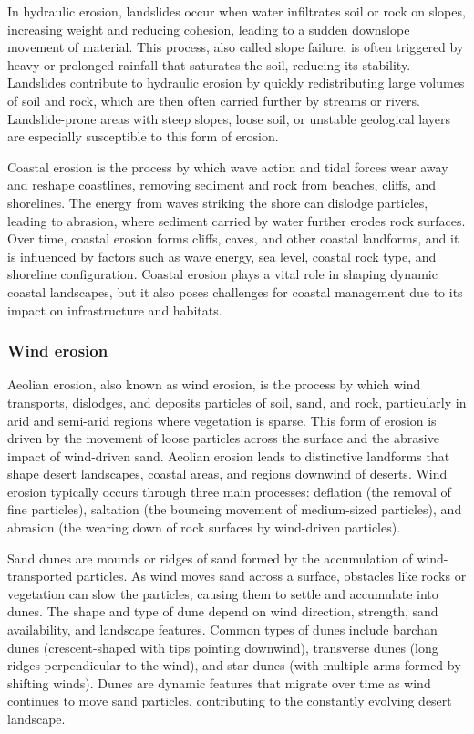 
In hydraulic erosion, landslides occur when water infiltrates soil or rock on slopes, increasing weight and reducing cohesion, leading to a sudden downslope movement of material. This process, also called slope failure, is often triggered by heavy or prolonged rainfall that saturates the soil, reducing its stability. Landslides contribute to hydraulic erosion by quickly redistributing large volumes of soil and rock, which are then often carried further by streams or rivers. Landslide-prone areas with steep slopes, loose soil, or unstable geological layers are especially susceptible to this form of erosion.


Coastal erosion is the process by which wave action and tidal forces wear away and reshape coastlines, removing sediment and rock from beaches, cliffs, and shorelines. The energy from waves striking the shore can dislodge particles, leading to abrasion, where sediment carried by water further erodes rock surfaces. Over time, coastal erosion forms cliffs, caves, and other coastal landforms, and it is influenced by factors such as wave energy, sea level, coastal rock type, and shoreline configuration. Coastal erosion plays a vital role in shaping dynamic coastal landscapes, but it also poses challenges for coastal management due to its impact on infrastructure and habitats.

\subsubsection{Wind erosion}
Aeolian erosion, also known as wind erosion, is the process by which wind transports, dislodges, and deposits particles of soil, sand, and rock, particularly in arid and semi-arid regions where vegetation is sparse. This form of erosion is driven by the movement of loose particles across the surface and the abrasive impact of wind-driven sand. Aeolian erosion leads to distinctive landforms that shape desert landscapes, coastal areas, and regions downwind of deserts. Wind erosion typically occurs through three main processes: deflation (the removal of fine particles), saltation (the bouncing movement of medium-sized particles), and abrasion (the wearing down of rock surfaces by wind-driven particles).

Sand dunes are mounds or ridges of sand formed by the accumulation of wind-transported particles. As wind moves sand across a surface, obstacles like rocks or vegetation can slow the particles, causing them to settle and accumulate into dunes. The shape and type of dune depend on wind direction, strength, sand availability, and landscape features. Common types of dunes include barchan dunes (crescent-shaped with tips pointing downwind), transverse dunes (long ridges perpendicular to the wind), and star dunes (with multiple arms formed by shifting winds). Dunes are dynamic features that migrate over time as wind continues to move sand particles, contributing to the constantly evolving desert landscape.


